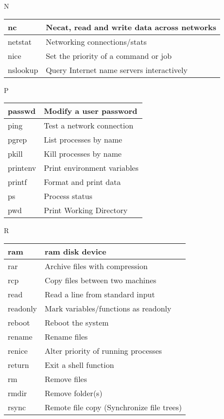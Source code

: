 \begin{flushleft}
\begin{tcolorbox}
	\textsc{N}
\end{tcolorbox}

\begin{tabular}{lp{12cm}}
	\hline
	nc &	Necat, read and write data across networks \\
	\hline
	netstat &	Networking connections/stats \\
	\hline
	nice &	Set the priority of a command or job \\
	\hline
	nslookup &	Query Internet name servers interactively \\
	\hline
\end{tabular}

\newpage

\begin{tcolorbox}
	\textsc{P}
\end{tcolorbox}

\begin{tabular}{lp{12cm}}
	\hline
	passwd &	Modify a user password \\
	\hline
	ping &	Test a network connection \\
	\hline
	pgrep &	List processes by name \\
	\hline
	pkill &	Kill processes by name \\
	\hline
	printenv &	Print environment variables \\
	\hline
	printf &	Format and print data \\
	\hline
	ps &	Process status \\
	\hline
	pwd &	Print Working Directory \\
	\hline
\end{tabular}


\begin{tcolorbox}
	\textsc{R}
\end{tcolorbox}

\begin{tabular}{lp{12cm}}
	\hline
	ram &	ram disk device \\
	\hline
	rar &	Archive files with compression \\
	\hline
	rcp &	Copy files between two machines \\
	\hline
	read &	Read a line from standard input \\ 
	\hline
	readonly &	Mark variables/functions as readonly \\
	\hline
	reboot &	Reboot the system \\
	\hline
	rename	& Rename files \\
	\hline
	renice &	Alter priority of running processes \\
	\hline
	return &	Exit a shell function \\
	\hline
	rm &	Remove files \\
	\hline
	rmdir &	Remove folder(s) \\
	\hline
	rsync &	Remote file copy (Synchronize file trees) \\
		\hline	
\end{tabular}


\end{flushleft}
